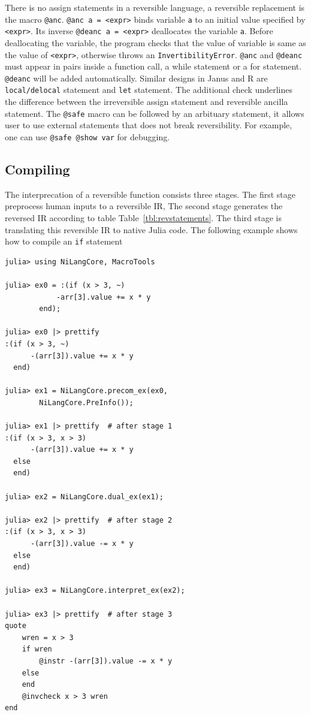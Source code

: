 \documentclass[aps,twocolumn,longbibliography,english,superscriptaddress,prr]{revtex4-1}
\newcommand{\<}{\langle}
\renewcommand{\>}{\rangle}
\newcommand{\Tbl}[1]{Table~\ref{#1}}
\theoremstyle{definition}\newtheorem{definition}{\textit{Definition}}
\begin{document}
    There is no assign statements in a reversible language, a reversible replacement is the macro \texttt{@anc}. \texttt{@anc a = <expr>} binds variable \texttt{a} to an initial value specified by \texttt{<expr>}. Its inverse \texttt{@deanc a = <expr>} deallocates the variable \texttt{a}. Before deallocating the variable, the program checks that the value of variable is same as the value of \texttt{<expr>}, otherwise throws an \texttt{InvertibilityError}. \texttt{@anc} and \texttt{@deanc} must appear in pairs inside a function call, a while statement or a for statement.
    \texttt{@deanc} will be added automatically. Similar designs in Janus and R are \texttt{local/delocal} statement and \texttt{let} statement.
    The additional check underlines the difference between the irreversible assign statement and reversible ancilla statement.
The \texttt{@safe} macro can be followed by an arbituary statement, it allows user to use external statements that does not break reversibility.
For example, one can use \texttt{@safe @show var} for debugging.

\subsection{Compiling}
The interprecation of a reversible function consists three stages.
The first stage preprocess human inputs to a reversible IR, 
The second stage generates the reversed IR according to table \Tbl{tbl:revstatements}.
The third stage is translating this reversible IR to native Julia code.
The following example shows how to compile an \texttt{if} statement

\begin{minipage}{.44\textwidth}
\begin{lstlisting}
julia> using NiLangCore, MacroTools

julia> ex0 = :(if (x > 3, ~)
            -arr[3].value += x * y
        end);
        
julia> ex0 |> prettify
:(if (x > 3, ~)
      -(arr[3]).value += x * y
  end)

julia> ex1 = NiLangCore.precom_ex(ex0,
        NiLangCore.PreInfo());
        
julia> ex1 |> prettify  # after stage 1
:(if (x > 3, x > 3)
      -(arr[3]).value += x * y
  else
  end)

julia> ex2 = NiLangCore.dual_ex(ex1);

julia> ex2 |> prettify  # after stage 2
:(if (x > 3, x > 3)
      -(arr[3]).value -= x * y
  else
  end)

julia> ex3 = NiLangCore.interpret_ex(ex2);

julia> ex3 |> prettify  # after stage 3
quote
    wren = x > 3
    if wren
        @instr -(arr[3]).value -= x * y
    else
    end
    @invcheck x > 3 wren
end
\end{lstlisting}
\end{minipage}
\end{document}
